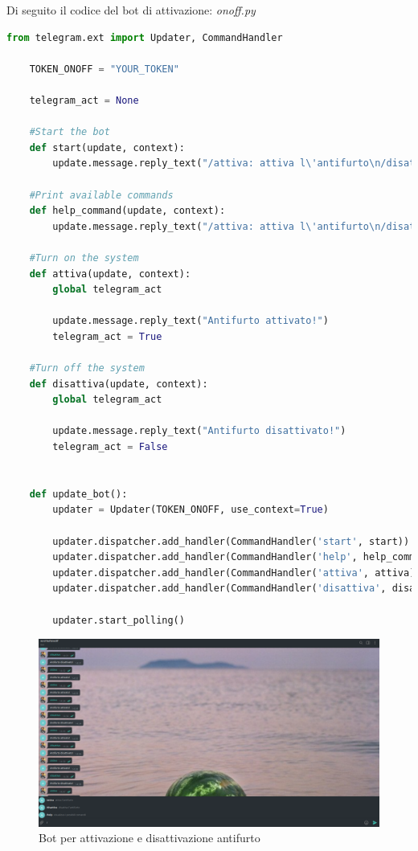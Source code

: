 \documentclass[12pt]{article}
\begin{document}
	\clearpage
	Di seguito il codice del bot di attivazione: \textit{onoff.py}
	\begin{lstlisting}[language=Python]
	from telegram.ext import Updater, CommandHandler

	TOKEN_ONOFF = "YOUR_TOKEN" 

	telegram_act = None

	#Start the bot
	def start(update, context):
    	update.message.reply_text("/attiva: attiva l\'antifurto\n/disattiva: disattiva l\'antifurto\n/help: visualizza i comandi")

	#Print available commands
	def help_command(update, context):
    	update.message.reply_text("/attiva: attiva l\'antifurto\n/disattiva: disattiva l\'antifurto\n/help: visualizza i comandi")

	#Turn on the system
	def attiva(update, context):
    	global telegram_act 

    	update.message.reply_text("Antifurto attivato!")
    	telegram_act = True

	#Turn off the system
	def disattiva(update, context):
   		global telegram_act

    	update.message.reply_text("Antifurto disattivato!")
   	 	telegram_act = False

    
	def update_bot():
    	updater = Updater(TOKEN_ONOFF, use_context=True)

    	updater.dispatcher.add_handler(CommandHandler('start', start))
    	updater.dispatcher.add_handler(CommandHandler('help', help_command))
    	updater.dispatcher.add_handler(CommandHandler('attiva', attiva))
    	updater.dispatcher.add_handler(CommandHandler('disattiva', disattiva))

    	updater.start_polling()
	\end{lstlisting}

	\clearpage
	\begin{figure}[h]
		\centering
		\includegraphics[width=5.0in]{onoff}
		\caption{Bot per attivazione e disattivazione antifurto}
	\end{figure}
	
\end{document}
